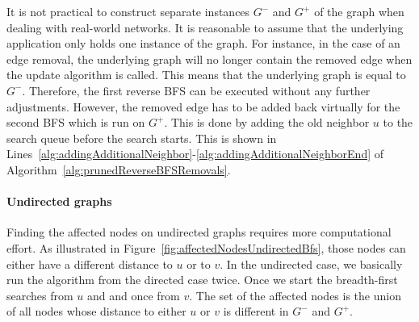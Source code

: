 It is not practical to construct separate instances $G^-$ and $G^{+}$ of the graph when dealing with real-world networks. It is reasonable to assume that the underlying application only holds one instance of the graph. For instance, in the case of an edge removal, the underlying graph will no longer contain the removed edge when the update algorithm is called. This means that the underlying graph is equal to $G^-$. Therefore, the first reverse BFS can be executed without any further adjustments. However, the removed edge has to be added back virtually for the second BFS which is run on $G^{+}$. This is done by adding the old neighbor $u$ to the search queue before the search starts. This is shown in Lines~\ref{alg:addingAdditionalNeighbor}-\ref{alg:addingAdditionalNeighborEnd} of Algorithm~\ref{alg:prunedReverseBFSRemovals}.

\paragraph{Undirected graphs}
Finding the affected nodes on undirected graphs requires more computational effort. As illustrated in Figure~\ref{fig:affectedNodesUndirectedBfs}, those nodes can either have a different distance to $u$ or to $v$. In the undirected case, we basically run the algorithm from the directed case twice. Once we start the breadth-first searches from $u$ and and once from $v$. The set of the affected nodes is the union of all nodes whose distance to either $u$ or $v$ is different in $G^-$ and $G^{+}$.

